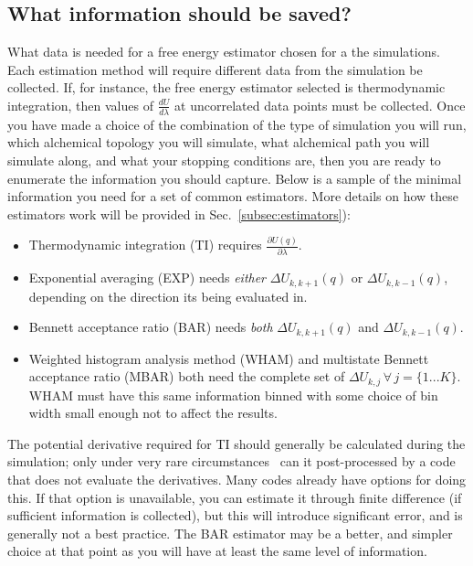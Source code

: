 \subsection{What information should be saved?}
\label{sec:information_saved}
What data is needed for a free energy estimator chosen for a the simulations. Each estimation method will require different data from the simulation be collected. If, for instance, the free energy estimator selected is thermodynamic integration, then values of $\frac{dU}{d\lambda}$ at uncorrelated data points must be collected. Once you have made a choice of the combination of the type of simulation you will run, which alchemical topology you will simulate, what alchemical path you will simulate along, and what your stopping conditions are, then you are ready to enumerate the information you should capture. Below is a sample of the minimal information you need for a set of common estimators. More details on how these estimators work will  be provided in Sec.~\ref{subsec:estimators}):

\begin{itemize}
    \item Thermodynamic integration (TI) requires $\frac{\partial U(q)}{\partial\lambda}$.
    \item Exponential averaging (EXP) needs \textit{either} $\Delta U_{k,k+1}(q)$ or $\Delta U_{k,k-1}(q)$, depending on the direction its being evaluated in.
    \item Bennett acceptance ratio (BAR) needs \textit{both} $\Delta U_{k,k+1}(q)$ and $\Delta U_{k,k-1}(q)$.
    \item Weighted histogram analysis method (WHAM) and multistate Bennett acceptance ratio (MBAR) both need the complete set of $\Delta U_{k,j} \, \forall \, j=\{1...K\}$. WHAM must have this same information binned with some choice of bin width small enough not to affect the results.
\end{itemize}

The potential derivative required for TI should generally be calculated during the simulation; only under very rare circumstances~\cite{naden2015linear} can it post-processed by a code that does not evaluate the derivatives. Many codes already have options for doing this.
If that option is unavailable, you can estimate it through finite difference (if sufficient information is collected), but this will introduce significant error, and is generally not a best practice. The BAR estimator may be a better, and simpler choice at that point as you will have at least the same level of information. 

